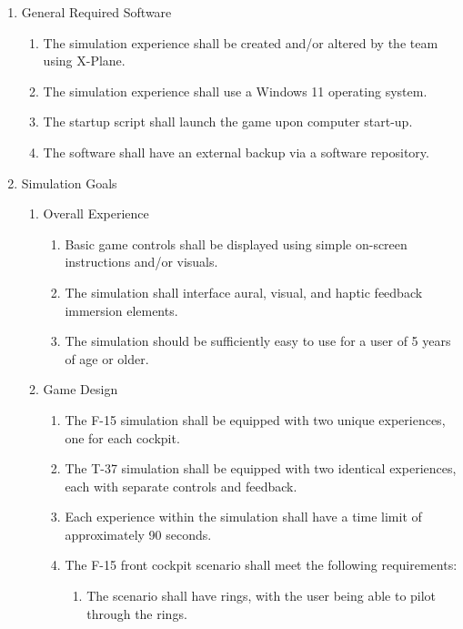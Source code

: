 \documentclass[12pt]{article} %
\begin{document}
\begin{enumerate}[label=\arabic*, leftmargin=*]
	\item General Required Software
	\begin{enumerate}[label=\arabic{enumi}.\arabic*, leftmargin=*]
		\item The simulation experience shall be created and/or altered by the team using X-Plane. 
		\item The simulation experience shall use a Windows 11 operating system. 
		\item The startup script shall launch the game upon computer start-up. 
		\item The software shall have an external backup via a software repository.
	\end{enumerate}
	\item Simulation Goals
	\begin{enumerate}[label=\arabic{enumi}.\arabic*, leftmargin=*]
		\item Overall Experience
		\begin{enumerate}[label=\arabic{enumi}.\arabic{enumii}.\arabic*, leftmargin=*]
			\item Basic game controls shall be displayed using simple on-screen instructions and/or visuals. 
			\item The simulation shall interface aural, visual, and haptic feedback immersion elements.
			\item The simulation should be sufficiently easy to use for a user of 5 years of age or older. 
		\end{enumerate}
		\item Game Design
		\begin{enumerate}[label=\arabic{enumi}.\arabic{enumii}.\arabic*, leftmargin=*]
			\item The F-15 simulation shall be equipped with two unique experiences, one for each cockpit. 
			\item The T-37 simulation shall be equipped with two identical experiences, each with separate controls and feedback. 
			\item Each experience within the simulation shall have a time limit of approximately 90 seconds. 
			\item The F-15 front cockpit scenario shall meet the following requirements:
			\begin{enumerate}[label=\arabic{enumi}.\arabic{enumii}.\arabic{enumiii}.\alph*, leftmargin=*]
				\item The scenario shall have rings, with the user being able to pilot through the rings. 

\end{enumerate}
\end{enumerate}
\end{enumerate}
\end{enumerate}
\end{document}
